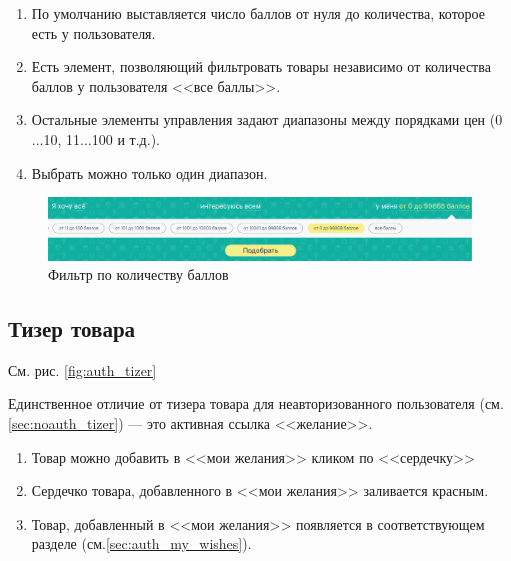             \begin{enumerate}
                \item По умолчанию выставляется число баллов от нуля до количества, которое есть у пользователя.
                \item Есть элемент, позволяющий фильтровать товары независимо от количества баллов у пользователя <<все баллы>>.
                \item Остальные элементы управления задают диапазоны между порядками цен (0$\dots$10, 11$\dots$100 и т.д.).
                \item Выбрать можно только один диапазон.
            \end{enumerate}

            
            \begin{figure}
                \center
                \includegraphics[width=170mm]{04_auth_funcs/figures/02.eps}
                \caption{Фильтр по количеству баллов}
                \label{fig:auth_filter}
            \end{figure}
        
        \subsection{Тизер товара}

            См. рис. \ref{fig:auth_tizer}
        
            Единственное отличие от тизера товара для неавторизованного пользователя (см. \ref{sec:noauth_tizer})
            --- это активная ссылка <<желание>>.
            \begin{enumerate}
                \item Товар можно добавить в <<мои желания>> кликом по <<сердечку>>
                \item Сердечко товара, добавленного в <<мои желания>> заливается красным.
                \item Товар, добавленный в <<мои желания>> появляется в соответствующем разделе (см.\ref{sec:auth_my_wishes}).
            \end{enumerate}

